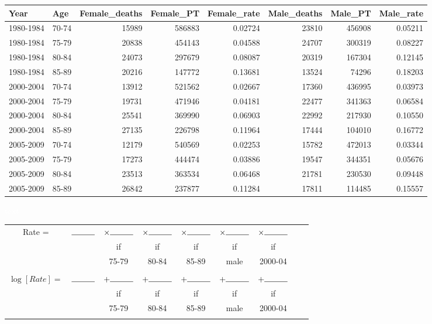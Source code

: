 \documentclass[10pt,handout]{beamer}\usepackage[]{graphicx}\usepackage[]{color}
\newenvironment{knitrout}{}{} %
\begin{document}
\begin{frame}
\begin{knitrout}\tiny
{}\color{fgcolor}
\begin{tabular}{l|l|r|r|r|r|r|r}
\hline
Year & Age & Female\_deaths & Female\_PT & Female\_rate & Male\_deaths & Male\_PT & Male\_rate\\
\hline
1980-1984 & 70-74 & 15989 & 586883 & 0.02724 & 23810 & 456908 & 0.05211\\
\hline
1980-1984 & 75-79 & 20838 & 454143 & 0.04588 & 24707 & 300319 & 0.08227\\
\hline
1980-1984 & 80-84 & 24073 & 297679 & 0.08087 & 20319 & 167304 & 0.12145\\
\hline
1980-1984 & 85-89 & 20216 & 147772 & 0.13681 & 13524 & 74296 & 0.18203\\
\hline
2000-2004 & 70-74 & 13912 & 521562 & 0.02667 & 17360 & 436995 & 0.03973\\
\hline
2000-2004 & 75-79 & 19731 & 471946 & 0.04181 & 22477 & 341363 & 0.06584\\
\hline
2000-2004 & 80-84 & 25541 & 369990 & 0.06903 & 22992 & 217930 & 0.10550\\
\hline
2000-2004 & 85-89 & 27135 & 226798 & 0.11964 & 17444 & 104010 & 0.16772\\
\hline
2005-2009 & 70-74 & 12179 & 540569 & 0.02253 & 15782 & 472013 & 0.03344\\
\hline
2005-2009 & 75-79 & 17273 & 444474 & 0.03886 & 19547 & 344351 & 0.05676\\
\hline
2005-2009 & 80-84 & 23513 & 363534 & 0.06468 & 21781 & 230530 & 0.09448\\
\hline
2005-2009 & 85-89 & 26842 & 237877 & 0.11284 & 17811 & 114485 & 0.15557\\
\hline
\end{tabular}


\end{knitrout}

\textcolor{white}{text}\newline

\begin{tabular}{c c c c c c c c c}
	Rate = & $\rule{1cm}{0.15mm}$ & $\times \rule{1cm}{0.15mm}$ & $\times \rule{1cm}{0.15mm}$ & $\times \rule{1cm}{0.15mm}$ & $\times \rule{1cm}{0.15mm}$ & $\times \rule{1cm}{0.15mm}$ \\
	& &   if  &  if &  if & if & if & \\
	& &  75-79 & 80-84 & 85-89 & male & 2000-04 \\  \\
	$\log[Rate] =$ & $\rule{1cm}{0.15mm}$ & $+ \rule{1cm}{0.15mm}$ & $+ \rule{1cm}{0.15mm}$ & $+ \rule{1cm}{0.15mm}$ & $+ \rule{1cm}{0.15mm}$ & $+ \rule{1cm}{0.15mm}$ \\
	& &   if  &  if &  if & if & if & \\
	& &  75-79 & 80-84 & 85-89 & male & 2000-04 \\ \\
	

\end{tabular}
\end{frame}
\end{document}
